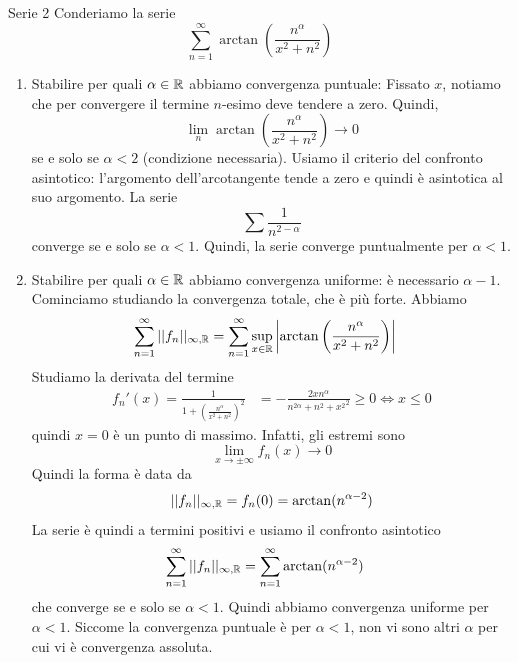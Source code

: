 \documentclass[a4paper]{article}
\begin{document}
\begin{snippetexercise}{Serie 2}
    Conderiamo la serie
    \[
        \sum_{n=1}^\infty \arctan\left(\frac{n^\alpha}{x^2 + n^2}\right)
    \]
    \begin{enumerate}
        \item Stabilire per quali \(\alpha \in \mathbb{R}\) abbiamo convergenza puntuale:
            Fissato \(x\), notiamo che per convergere il termine \(n\)-esimo deve tendere a zero.
            Quindi,
            \[
                \lim_n \arctan\left(\frac{n^\alpha}{x^2 + n^2}\right) \to 0
            \]
            se e solo se \(\alpha < 2\) (condizione necessaria).
            Usiamo il criterio del confronto asintotico: l'argomento dell'arcotangente tende a zero
            e quindi è asintotica al suo argomento.
            La serie
            \[
                \sum \frac{1}{n^{2 - \alpha}}
            \]
            converge se e solo se \(\alpha < 1\).
            Quindi, la serie converge puntualmente per \(\alpha < 1\).
        \item Stabilire per quali \(\alpha \in \mathbb{R}\) abbiamo convergenza uniforme:
        è necessario \(\alpha - 1\). Cominciamo studiando la convergenza totale, che è più forte.
        Abbiamo
        \begin{align*}
            \sum_{n=1}^\infty ||f_n||_{\infty, \mathbb{R}}
            &=\sum_{n=1}^\infty \sup_{x\in\mathbb{R}} \left|
                \arctan\left(\frac{n^\alpha}{x^2 + n^2}\right)
            \right|
        \end{align*}
        Studiamo la derivata del termine
        \begin{align*}
            f_n'(x) = \frac{1}{1 + {\left(\frac{n^\alpha}{x^2 + n^2}\right)}^2}
            &= - \frac{2xn^\alpha}{n^{2\alpha} + {n^2 + x^2}^2} \geq 0 \iff x \leq 0
        \end{align*}
        quindi \(x=0\) è un punto di massimo.
        Infatti, gli estremi sono
        \[
            \lim_{x\to\pm\infty} f_n(x) \to 0
        \]
        Quindi la forma è data da
        \[
            ||f_n||_{\infty, \mathbb{R}} = f_n(0) = \arctan(n^{\alpha - 2})
        \]
        La serie è quindi a termini positivi e usiamo il confronto asintotico
        \begin{align*}
            \sum_{n=1}^\infty ||f_n||_{\infty, \mathbb{R}} &=
            \sum_{n=1}^\infty \arctan(n^{\alpha - 2})
        \end{align*}
        che converge se e solo se \(\alpha < 1\). Quindi abbiamo convergenza uniforme
        per \(\alpha < 1\). Siccome la convergenza puntuale è per \(\alpha < 1\),
        non vi sono altri \(\alpha\) per cui vi è convergenza assoluta.
    \end{enumerate}
\end{snippetexercise}
\end{document}
